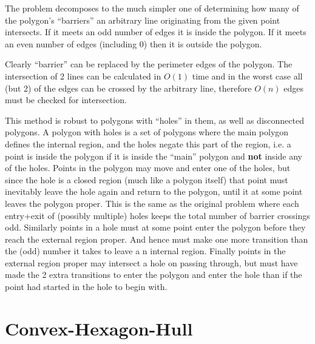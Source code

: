 The problem decomposes to the much simpler one of determining how many of the polygon's ``barriers'' an arbitrary line originating from the given point intersects.
If it meets an odd number of edges it is inside the polygon.  If it meets an even number of edges (including 0) then it is outside the polygon.

Clearly ``barrier'' can be replaced by the perimeter edges of the polygon.  The intersection of 2 lines can be calculated in $O(1)$ time and in the worst case all (but 2) of the edges can be crossed by the arbitrary line, therefore $O(n)$ edges must be checked for intersection.

This method is robust to polygons with ``holes'' in them, as well as disconnected polygons.
A polygon with holes is a set of polygons where the main polygon defines the internal region, and the holes negate this part of the region, i.e. a point is inside the polygon if it is inside the ``main'' polygon and {\bf not} inside any of the holes.
Points in the polygon may move and enter one of the holes, but since the hole is a closed region (much like a polygon itself) that point must inevitably leave the hole again and return to the polygon, until it at some point leaves the polygon proper.  This is the same as the original problem where each entry+exit of (possibly multiple) holes keeps the total number of barrier crossings odd.
Similarly points in a hole must at some point enter the polygon before they reach the external region proper.  And hence must make one more transition than the (odd) number it takes to leave a n internal region.
Finally points in the external region proper may intersect a hole on passing through, but must have made the 2 extra transitions to enter the polygon and enter the hole than if the point had started in the hole to begin with.

\section {Convex-Hexagon-Hull}

